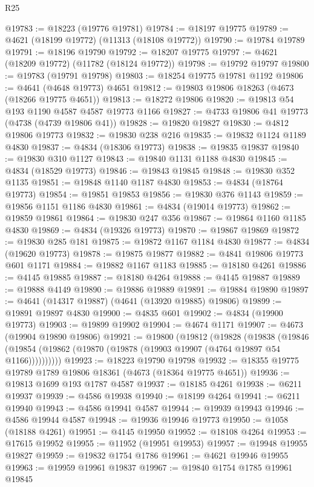 \begin{lexlean}{R25}
\begin{coremodule}
@19783 := @18223 (@19776 @19781)
@19784 := @18197 @19775
@19789 := @4621 (@18199 @19772) (@11313 (@18108 @19772))
@19790 := @19784 @19789
@19791 := @18196 @19790
@19792 := @18207 @19775
@19797 := @4621 (@18209 @19772) (@11782 (@18124 @19772))
@19798 := @19792 @19797
@19800 := @19783 (@19791 @19798)
@19803 := @18254 @19775 @19781 @1192
@19806 := @4641 (@4648 @19773) @4651
@19812 := @19803 @19806 @18263 (@4673 (@18266 @19775 @4651))
@19813 := @18272 @19806
@19820 := @19813 @54 @193 @1190 @4587 @4587 @19773 @1166
@19827 := @4733 @19806 @41 @19773 (@4738 (@4739 @19806 @41))
@19828 := @19820 @19827
@19830 := @4812 @19806 @19773
@19832 := @19830 @238 @216
@19835 := @19832 @1124 @1189 @4830
@19837 := @4834 (@18306 @19773)
@19838 := @19835 @19837
@19840 := @19830 @310 @1127
@19843 := @19840 @1131 @1188 @4830
@19845 := @4834 (@18529 @19773)
@19846 := @19843 @19845
@19848 := @19830 @352 @1135
@19851 := @19848 @1140 @1187 @4830
@19853 := @4834 (@18764 @19773)
@19854 := @19851 @19853
@19856 := @19830 @376 @1143
@19859 := @19856 @1151 @1186 @4830
@19861 := @4834 (@19014 @19773)
@19862 := @19859 @19861
@19864 := @19830 @247 @356
@19867 := @19864 @1160 @1185 @4830
@19869 := @4834 (@19326 @19773)
@19870 := @19867 @19869
@19872 := @19830 @285 @181
@19875 := @19872 @1167 @1184 @4830
@19877 := @4834 (@19620 @19773)
@19878 := @19875 @19877
@19882 := @4841 @19806 @19773 @601 @1171
@19884 := @19882 @1167 @1183
@19885 := @18180 @4261
@19886 := @4145 @19885
@19887 := @18180 @4264
@19888 := @4145 @19887
@19889 := @19888 @4149
@19890 := @19886 @19889
@19891 := @19884 @19890
@19897 := @4641 (@14317 @19887) (@4641 (@13920 @19885) @19806)
@19899 := @19891 @19897 @4830
@19900 := @4835 @601
@19902 := @4834 (@19900 @19773)
@19903 := @19899 @19902
@19904 := @4674 @1171
@19907 := @4673 (@19904 @19890 @19806)
@19921 := @19800
    (@19812
      (@19828
        (@19838
          (@19846 (@19854 (@19862 (@19870 (@19878 (@19903 @19907 (@4764 @19897 @54 @1166))))))))))
@19923 := @18223 @19790 @19798
@19932 := @18355 @19775 @19789 @1789 @19806 @18361 (@4673 (@18364 @19775 @4651))
@19936 := @19813 @1699 @193 @1787 @4587
@19937 := @18185 @4261
@19938 := @6211 @19937
@19939 := @4586 @19938
@19940 := @18199 @4264
@19941 := @6211 @19940
@19943 := @4586 @19941 @4587
@19944 := @19939 @19943
@19946 := @4586 @19944 @4587
@19948 := @19936 @19946 @19773
@19950 := @1058 (@18188 @4261)
@19951 := @4145 @19950
@19952 := @18108 @4264
@19953 := @17615 @19952
@19955 := @11952 (@19951 @19953)
@19957 := @19948 @19955 @19827
@19959 := @19832 @1754 @1786
@19961 := @4621 @19946 @19955
@19963 := @19959 @19961 @19837
@19967 := @19840 @1754 @1785 @19961 @19845

\end{coremodule}
\end{lexlean}
